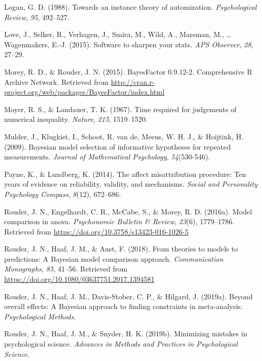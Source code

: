 \documentclass[english,,man]{apa6}
\begin{document}
\leavevmode\hypertarget{ref-Logan:1988}{}%
Logan, G. D. (1988). Towards an instance theory of automization. \emph{Psychological Review}, \emph{95}, 492--527.

\leavevmode\hypertarget{ref-Love:etal:2015}{}%
Love, J., Selker, R., Verhagen, J., Smira, M., Wild, A., Marsman, M., \ldots{} Wagenmakers, E.-J. (2015). Software to sharpen your stats. \emph{APS Observer}, \emph{28}, 27--29.

\leavevmode\hypertarget{ref-Morey:Rouder:BayesFactorPackage}{}%
Morey, R. D., \& Rouder, J. N. (2015). BayesFactor 0.9.12-2. Comprehensive R Archive Network. Retrieved from \url{http://cran.r-project.org/web/packages/BayesFactor/index.html}

\leavevmode\hypertarget{ref-Moyer:Landauer:1967}{}%
Moyer, R. S., \& Landauer, T. K. (1967). Time required for judgements of numerical inequality. \emph{Nature}, \emph{215}, 1519--1520.

\leavevmode\hypertarget{ref-Mulder:etal:2009}{}%
Mulder, J., Klugkist, I., Schoot, R. van de, Meeus, W. H. J., \& Hoijtink, H. (2009). Bayesian model selection of informative hypotheses for repeated measurements. \emph{Journal of Mathematical Psychology}, \emph{54}(530-546).

\leavevmode\hypertarget{ref-Payne:Lundberg:2014}{}%
Payne, K., \& Lundberg, K. (2014). The affect misattribution procedure: Ten years of evidence on reliability, validity, and mechanisms. \emph{Social and Personality Psychology Compass}, \emph{8}(12), 672--686.

\leavevmode\hypertarget{ref-Rouder:etal:2016d}{}%
Rouder, J. N., Engelhardt, C. R., McCabe, S., \& Morey, R. D. (2016a). Model comparison in anova. \emph{Psychonomic Bulletin \& Review}, \emph{23}(6), 1779--1786. Retrieved from \url{https://doi.org/10.3758/s13423-016-1026-5}

\leavevmode\hypertarget{ref-Rouder:etal:2018}{}%
Rouder, J. N., Haaf, J. M., \& Aust, F. (2018). From theories to models to predictions: A Bayesian model comparison approach. \emph{Communication Monographs}, \emph{85}, 41--56. Retrieved from \url{https://doi.org/10.1080/03637751.2017.1394581}

\leavevmode\hypertarget{ref-Rouder:etal:2019b}{}%
Rouder, J. N., Haaf, J. M., Davis-Stober, C. P., \& Hilgard, J. (2019a). Beyond overall effects: A Bayesian approach to finding constraints in meta-analysis. \emph{Psychological Methods}.

\leavevmode\hypertarget{ref-Rouder:etal:2019a}{}%
Rouder, J. N., Haaf, J. M., \& Snyder, H. K. (2019b). Minimizing mistakes in psychological science. \emph{Advances in Methods and Practices in Psychological Science}.
\end{document}
